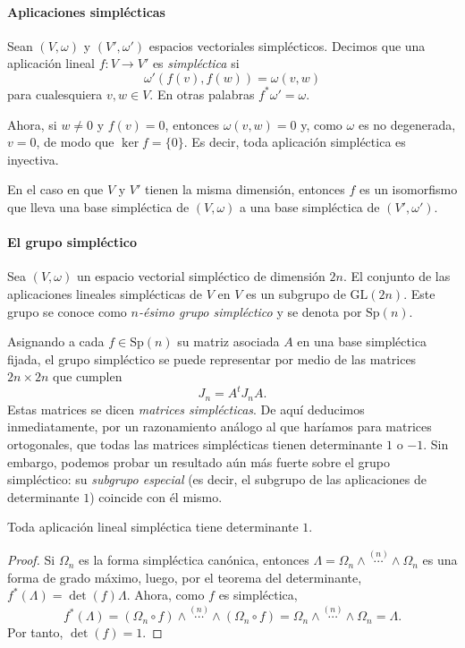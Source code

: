 \paragraph{\bf Aplicaciones simplécticas}\mbox{}

  Sean $(V,\omega)$ y $(V',\omega')$ espacios vectoriales simplécticos. Decimos que una aplicación lineal $f:V \rightarrow V'$ es \emph{simpléctica} si
  \[
    \omega'(f(v),f(w)) = \omega(v,w)
  \]
  para cualesquiera $v,w \in V$. En otras palabras $f^*\omega'=\omega$.

Ahora, si $w\neq 0$ y $f(v)=0$, entonces $\omega(v,w)=0$ y, como $\omega$ es no degenerada, $v=0$, de modo que $\ker f=\{0\}$. Es decir, toda aplicación simpléctica es inyectiva.

En el caso en que $V$ y $V'$ tienen la misma dimensión, entonces $f$ es un isomorfismo que lleva una base simpléctica de $(V,\omega)$ a una base simpléctica de $(V',\omega')$. 

\paragraph{\bf El grupo simpléctico}\mbox{}

  Sea $(V,\omega)$ un espacio vectorial simpléctico de dimensión $2n$. El conjunto de las aplicaciones lineales simplécticas de $V$ en $V$ es un subgrupo de $\mathrm{GL}(2n)$. Este grupo se conoce como \emph{$n$-ésimo grupo simpléctico} y se denota por $\mathrm{Sp}(n)$.

  Asignando a cada $f\in \mathrm{Sp}(n)$ su matriz asociada $A$ en una base simpléctica fijada, el grupo simpléctico se puede representar por medio de las matrices $2n\times 2n$ que cumplen
  \begin{equation*}
    J_n=A^tJ_n A.
  \end{equation*}
  Estas matrices se dicen \emph{matrices simplécticas}.
  De aquí deducimos inmediatamente, por un razonamiento análogo al que haríamos para matrices ortogonales, que todas las matrices simplécticas tienen determinante $1$ o $-1$. Sin embargo, podemos probar un resultado aún más fuerte sobre el grupo simpléctico: su \emph{subgrupo especial} (es decir, el subgrupo de las aplicaciones de determinante $1$) coincide con él mismo.
\begin{prop}
  Toda aplicación lineal simpléctica tiene determinante $1$.
\end{prop}
\begin{proof}
  Si $\Omega_n$ es la forma simpléctica canónica, entonces $\Lambda=\Omega_n \wedge \overset{(n)}{\cdots} \wedge \Omega_n$ es una forma de grado máximo, luego, por el teorema del determinante, $f^*(\Lambda)=\det(f) \Lambda$. Ahora, como $f$ es simpléctica, 
  \begin{equation*}
    f^*(\Lambda) = (\Omega_n \circ f) \wedge \overset{(n)}{\cdots} \wedge (\Omega_n \circ f)=\Omega_n \wedge \overset{(n)}{\cdots} \wedge \Omega_n = \Lambda.
  \end{equation*}
  Por tanto, $\det(f)=1$.
\end{proof}
